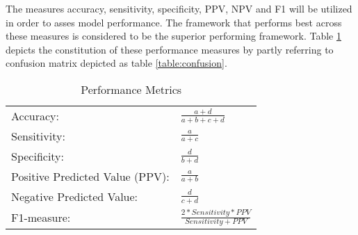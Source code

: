 \documentclass{article}
\begin{document}
The measures accuracy, sensitivity, specificity, PPV, NPV and F1 will be utilized in order to asses model performance. The framework that performs best across these measures is considered to be the superior performing framework. Table \ref{table:metrics} depicts the constitution of these performance measures by partly referring to confusion matrix depicted as table \ref{table:confusion}. 
\bigskip
\bgroup
\def\arraystretch{1.8}%
\begin{table}[h]
\centering
\caption{Performance Metrics}
\label{table:metrics}
\begin{tabular}{ll}
\hline
Accuracy:                       & \(\frac{\!\!\!\!\!\!\!\!\!\!\!\!\!\!a+d}{a+b+c+d}\) \\
Sensitivity:                    & \(\frac{a}{a+c}\)                                   \\
Specificity:                    & \(\frac{d}{b+d}\)                                   \\
Positive Predicted Value (PPV): & \(\frac{a}{a+b}\)                                   \\
Negative Predicted Value:       & \(\frac{d}{c+d}\)                                   \\
F1-measure:                     & \(\frac{2*Sensitivity*PPV}{Sensitivity+PPV}\)       \\ \hline
\end{tabular}
\end{table}
\egroup

\newpage



\end{document}
